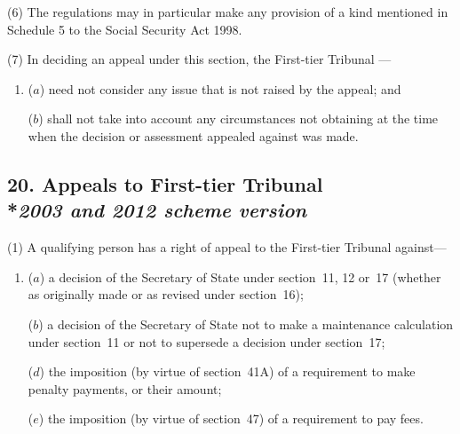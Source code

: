 \documentclass[12pt,a4paper]{article}
\begin{document}
(6) The regulations may in particular make any provision of a kind mentioned in Schedule 5 to the Social Security Act 1998.

(7) In deciding an appeal under this section, 
the First-tier Tribunal%
—
\begin{enumerate}\item[]
($a$) need not consider any issue that is not raised by the appeal; and

($b$) shall not take into account any circumstances not obtaining at the time when the decision or assessment appealed against was made.
\end{enumerate}


\subsection[20. Appeals to 
First-tier Tribunal  %
--- \emph{2003 and 2012 scheme version}]{20. Appeals to 
First-tier Tribunal%
\\*\emph{2003 and 2012 scheme version}}

(1) A qualifying person has a right of appeal to 
the First-tier Tribunal  %
against—
\begin{enumerate}\item[]
($a$) a decision of the 
Secretary of State  %
under section~11, 12 or~17 (whether as originally made or as revised under section~16);

($b$) a decision of the 
Secretary of State  %
not to make a maintenance calculation under section~11 or not to supersede a decision under section~17;


($d$) the imposition (by virtue of section~41A) of a requirement to make penalty payments, or their amount;

($e$) the imposition (by virtue of section~47) of a requirement to pay fees.
\end{enumerate}
\end{document}
